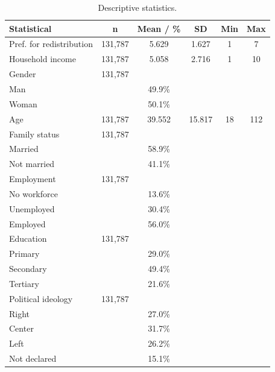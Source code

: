\documentclass[utf8]{frontiersSCNS} %
\begin{document}
\begin{table}
\small\sf\centering
\caption{Descriptive statistics.}
\label{tab:descreptive}
\begin{tabular}{lccccc}
\toprule
Statistical & n & Mean / \% & SD & Min & Max \\
\midrule
Pref. for redistribution & 131,787 & 5.629 & 1.627 & 1 & 7 \\
Household income & 131,787 & 5.058 & 2.716 & 1 & 10 \\
Gender & 131,787 &  &  & &  \\
\hspace{3mm}Man & & 49.9\% & & & \\
\hspace{3mm}Woman & & 50.1\% & & & \\
Age & 131,787 & 39.552 & 15.817 & 18 & 112 \\
Family status & 131,787 &  &  &  &  \\
\hspace{3mm}Married & & 58.9\% & & & \\
\hspace{3mm}Not married & & 41.1\% & & & \\
Employment & 131,787 &  &  &  &  \\
\hspace{3mm}No workforce & & 13.6\% & & & \\
\hspace{3mm}Unemployed & & 30.4\% & & & \\
\hspace{3mm}Employed & & 56.0\% & & & \\
Education & 131,787 &  &  &  &  \\
\hspace{3mm}Primary & & 29.0\% & & & \\
\hspace{3mm}Secondary & & 49.4\% & & & \\
\hspace{3mm}Tertiary & & 21.6\% & & & \\
Political ideology & 131,787 & & & & \\
\hspace{3mm}Right & & 27.0\% & & & \\
\hspace{3mm}Center & & 31.7\% & & & \\
\hspace{3mm}Left & & 26.2\% & & & \\
\hspace{3mm}Not declared & & 15.1\% & & & \\

\end{tabular}
\end{table}
\end{document}
